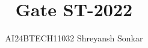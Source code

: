\documentclass[journal]{IEEEtran}
\begin{document}

\vspace{3cm}

\title{Gate ST-2022}
\author{AI24BTECH11032 Shreyansh Sonkar}
{\let\newpage\relax\maketitle}

\renewcommand{\thefigure}{\theenumi}
\renewcommand{\thetable}{\theenumi}
\setlength{\intextsep}{10pt} %


\renewcommand{\thetable}{\theenumi}
\end{document}
